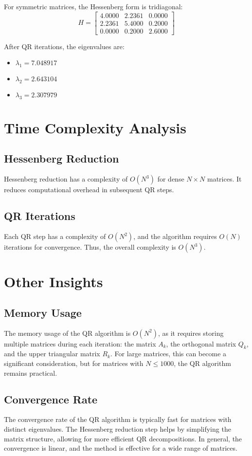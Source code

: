 \documentclass[12pt,a4paper]{article}
\begin{document}
For symmetric matrices, the Hessenberg form is tridiagonal:
\[
H = \begin{bmatrix}
4.0000 & 2.2361 & 0.0000 \\
2.2361 & 5.4000 & 0.2000 \\
0.0000 & 0.2000 & 2.6000
\end{bmatrix}
\]

After QR iterations, the eigenvalues are:
\begin{itemize}
    \item \( \lambda_1 = 7.048917 \)
    \item \( \lambda_2 =  2.643104 \)
    \item \( \lambda_3 = 2.307979 \)
\end{itemize}

\section{Time Complexity Analysis}
\subsection{Hessenberg Reduction}
Hessenberg reduction has a complexity of \( O(N^3) \) for dense \( N \times N \) matrices. It reduces computational overhead in subsequent QR steps.

\subsection{QR Iterations}
Each QR step has a complexity of \( O(N^2) \), and the algorithm requires \( O(N) \) iterations for convergence. Thus, the overall complexity is \( O(N^3) \).

\section{Other Insights}
\subsection{Memory Usage}
The memory usage of the QR algorithm is \( O(N^2)\), as it requires storing multiple matrices during each iteration: the matrix \( A_k \), the orthogonal matrix \( Q_k \), and the upper triangular matrix \( R_k \). For large matrices, this can become a significant consideration, but for matrices with \( N \leq 1000 \), the QR algorithm remains practical.

\subsection{Convergence Rate}
The convergence rate of the QR algorithm is typically fast for matrices with distinct eigenvalues. The Hessenberg reduction step helps by simplifying the matrix structure, allowing for more efficient QR decompositions. In general, the convergence is linear, and the method is effective for a wide range of matrices.
\end{document}
